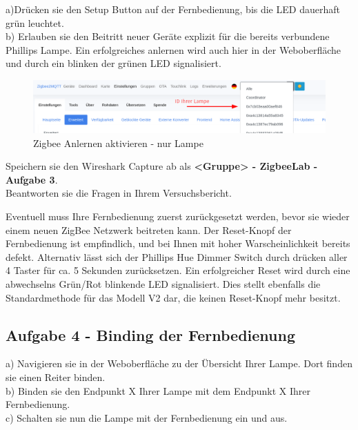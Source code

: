 a)Drücken sie den Setup Button auf der Fernbedienung, bis die LED dauerhaft grün leuchtet.  \\
b) Erlauben sie den Beitritt neuer Geräte explizit für die bereits verbundene Phillips Lampe.
Ein erfolgreiches anlernen wird auch hier in der Weboberfläche
und durch ein blinken der grünen LED signalisiert. 


\begin{figure}[H]
    \centering
    \includegraphics[width=1\textwidth]{media/Z2M-Anlernen-Lampe.png}
    \caption{Zigbee Anlernen aktivieren - nur Lampe}
\end{figure}

\begin{Aufgabe}
    Speichern sie den Wireshark Capture ab als \textbf{\grqq <Gruppe> - ZigbeeLab - Aufgabe 3\grqq{}}. \\
    Beantworten sie die Fragen in Ihrem Versuchsbericht.
\end{Aufgabe}

\begin{Hinweis}
    Eventuell muss Ihre Fernbedienung zuerst zurückgesetzt werden, bevor sie wieder einem neuen ZigBee Netzwerk beitreten kann.
    Der Reset-Knopf der Fernbedienung ist empfindlich, und bei Ihnen mit hoher Warscheinlichkeit bereits defekt. Alternativ lässt sich der Phillips Hue
    Dimmer Switch durch drücken aller 4 Taster für ca. 5 Sekunden zurücksetzen. Ein erfolgreicher Reset wird durch eine abwechselns Grün/Rot blinkende LED
    signalisiert. Dies stellt ebenfalls die Standardmethode für das Modell V2 dar, die keinen Reset-Knopf mehr besitzt.
\end{Hinweis}

\subsection{Aufgabe 4 - Binding der Fernbedienung}

a) Navigieren sie in der Weboberfläche zu der Übersicht Ihrer Lampe. Dort finden sie einen Reiter \grqq binden\grqq{}. \\
b) Binden sie den Endpunkt X Ihrer Lampe mit dem Endpunkt X Ihrer Fernbedienung. \\
c) Schalten sie nun die Lampe mit der Fernbedienung ein und aus. 

